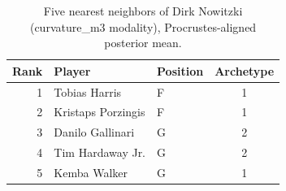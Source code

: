 \begin{table}[htbp]
  \centering\small
  \begin{tabular}{rllc}
    \toprule
    Rank & Player & Position & Archetype \\
    \midrule
    1 & Tobias Harris & F & 1 \\
    2 & Kristaps Porzingis & F & 1 \\
    3 & Danilo Gallinari & G & 2 \\
    4 & Tim Hardaway Jr. & G & 2 \\
    5 & Kemba Walker & G & 1 \\
    \bottomrule
  \end{tabular}
  \caption{Five nearest neighbors of Dirk Nowitzki (curvature_m3 modality), Procrustes-aligned posterior mean.}
  \label{tab:Dirk_Nowitzki_neighbors_curvature_m3}
\end{table}

